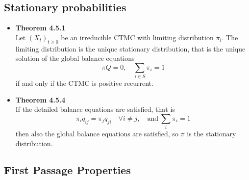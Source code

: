 \documentclass[11pt,a4paper]{article}
\begin{document}
\subsection{Stationary probabilities}

\begin{itemize}
    \item \textbf{Theorem 4.5.1} \\
        Let ${(X_t)}_{t \geq 0}$ be an irreducible CTMC with limiting distribution $\pi_i$.
        The limiting distribution is the unique stationary distribution,
        that is the unique solution of the global balance equations
        \[
            \pi Q = 0, \quad \sum_{i \in S} \pi_i = 1
        \]
        if and only if the CTMC is positive recurrent.

    \item \textbf{Theorem 4.5.4} \\
        If the detailed balance equations are satisfied, that is
        \[
            \pi_i q_{ij} = \pi_j q_{ji} \quad \forall i \neq j, \quad \text{and} \
            \sum_i \pi_i = 1
        \]
        then also the global balance equations are satisfied, so $\pi$ is the
        stationary distribution.

\end{itemize}

\subsection{First Passage Properties}
\end{document}
